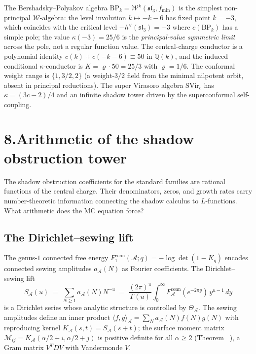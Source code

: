 \documentclass[11pt,reqno]{amsart}
\makeatletter
\theoremstyle{definition}
\theoremstyle{remark}
\providecommand{\cA}{\mathcal{A}}
\providecommand{\cW}{\mathcal{W}}
\providecommand{\conn}{\mathrm{conn}}
\numberwithin{equation}{section}
\let\svy@oldref\ref
\renewcommand{\ref}[1]{%
 \@ifundefined{r@#1}{\textit{full monograph}}{\svy@oldref{#1}}%
}
\makeatother
\begin{document}
The Bershadsky--Polyakov algebra $\mathrm{BP}_k = \cW^k(\mathfrak{sl}_3,
f_{\mathrm{min}})$ is the simplest non-principal $\cW$-algebra:
the level involution $k \mapsto -k-6$ has fixed point $k = -3$, which
coincides with the critical level $-h^\vee(\mathfrak{sl}_3) = -3$ where
$c(\mathrm{BP}_k)$ has a simple pole; the value $\kappa(-3) = 25/6$
is the \emph{principal-value symmetric limit} across the pole, not a
regular function value. The central-charge conductor is a polynomial
identity $c(k) + c(-k-6) \equiv 50$ in $\mathbb{Q}(k)$, and the induced
conditional $\kappa$-conductor is $K = \varrho \cdot 50 = 25/3$ with
$\varrho = 1/6$. The conformal weight range is $\{1, 3/2, 2\}$
(a weight-$3/2$ field from the minimal nilpotent orbit, absent in
principal reductions). The super Virasoro algebra $\mathrm{SVir}_c$
has $\kappa = (3c-2)/4$ and an infinite shadow tower driven by the
superconformal self-coupling.


\section*{8.\quad Arithmetic of the shadow obstruction tower}

The shadow obstruction coefficients for the standard families are
rational functions of the central charge. Their denominators,
zeros, and growth rates carry number-theoretic information
connecting the shadow calculus to $L$-functions. What arithmetic
does the MC equation force?

\subsection*{The Dirichlet--sewing lift}

The genus-$1$ connected free energy $F_1^{\conn}(\cA;q) =
-\log\det(1 - K_q)$ encodes connected sewing amplitudes
$a_\cA(N)$ as Fourier coefficients. The Dirichlet--sewing lift
\begin{equation}\label{eq:preface-dirichlet-sewing-b}
S_\cA(u)
\;=\;
\sum_{N \ge 1} a_\cA(N) N^{-u}
\;=\;
\frac{(2\pi)^u}{\Gamma(u)}
\int_0^\infty F_\cA^{\conn}(e^{-2\pi y})\, y^{u-1}\, dy
\end{equation}
is a Dirichlet series whose analytic structure is controlled by
$\Theta_\cA$. The sewing amplitudes define an inner product
$\langle f, g\rangle_\cA = \sum_N a_\cA(N) f(N) g(N)$ with
reproducing kernel $K_\cA(s,t) = S_\cA(s+t)$; the surface
moment matrix
$\mathscr M_{ij} = K_\cA(\alpha/2 + i, \alpha/2 + j)$ is
positive definite for all $\alpha \ge 2$
(Theorem~\ref{thm:gram-positivity}), a Gram matrix $V^T D V$
with Vandermonde $V$.
\end{document}
